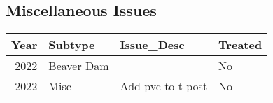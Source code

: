 \documentclass[
]{article}
\begin{document}
\hypertarget{miscellaneous-issues}{%
\subsection{Miscellaneous Issues}\label{miscellaneous-issues}}

\begin{longtable}[]{@{}rlll@{}}
\toprule()
Year & Subtype & Issue\_Desc & Treated \\
\midrule()
\endhead
2022 & Beaver Dam & & No \\
2022 & Misc & Add pvc to t post & No \\
\bottomrule()
\end{longtable}
\end{document}
